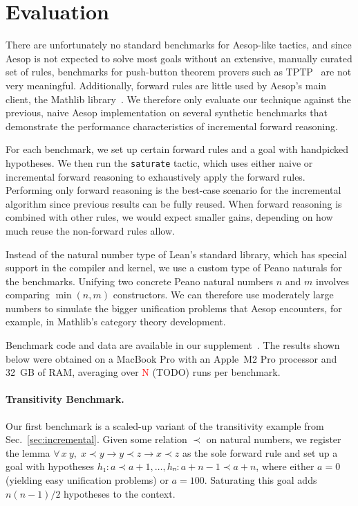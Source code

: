 \documentclass[runningheads,leqno]{llncs}
\newcommand{\All}[2]{\ensuremath{\forall\, #1,\; #2}}
\begin{document}
\section{Evaluation}%
\label{sec:evaluation}

There are unfortunately no standard benchmarks for Aesop-like tactics, and since Aesop is not expected to solve most goals without an extensive, manually curated set of rules, benchmarks for push-button theorem provers such as TPTP~\cite{TPTP} are not very meaningful.
Additionally, forward rules are little used by Aesop's main client, the Mathlib library~\cite{Mathlib}.
We therefore only evaluate our technique against the previous, naive Aesop implementation on several synthetic benchmarks that demonstrate the performance characteristics of incremental forward reasoning.

For each benchmark, we set up certain forward rules and a goal with handpicked hypotheses.
We then run the \texttt{saturate} tactic, which uses either naive or incremental forward reasoning to exhaustively apply the forward rules.
Performing only forward reasoning is the best-case scenario for the incremental algorithm since previous results can be fully reused.
When forward reasoning is combined with other rules, we would expect smaller gains, depending on how much reuse the non-forward rules allow.

Instead of the natural number type of Lean's standard library, which has special support in the compiler and kernel, we use a custom type of Peano naturals for the benchmarks.
Unifying two concrete Peano natural numbers $n$ and $m$ involves comparing $\min(n, m)$ constructors.
We can therefore use moderately large numbers to simulate the bigger unification problems that Aesop encounters, for example, in Mathlib's category theory development.

Benchmark code and data are available in our supplement~\cite{supplement}.
The results shown below were obtained on a MacBook Pro with an Apple~M2 Pro processor and \SI{32}{GB} of RAM, averaging over \textcolor{red}{N} (TODO) runs per benchmark.

\paragraph{Transitivity Benchmark.}
Our first benchmark is a scaled-up variant of the transitivity example from Sec.~\ref{sec:incremental}.
Given some relation $≺$ on natural numbers, we register the lemma $\All{x~y}{x ≺ y → y ≺ z → x ≺ z}$ as the sole forward rule and set up a goal with hypotheses $h₁ : a ≺ a + 1, \dots, hₙ : a + n - 1 ≺ a + n$, where either $a = 0$ (yielding easy unification problems) or $a = 100$.
Saturating this goal adds $n(n-1)/2$ hypotheses to the context.
\end{document}
